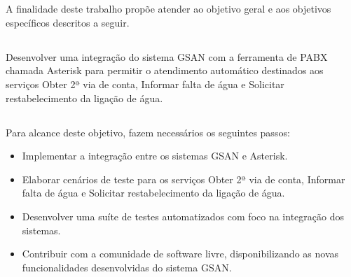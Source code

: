 \section*{\fontsize{12}{1} }

A finalidade deste trabalho propõe atender ao objetivo geral e aos objetivos específicos descritos a seguir.

\subsection*{\fontsize{12}{1} }

Desenvolver uma integração do sistema GSAN com a ferramenta de PABX chamada Asterisk para permitir o atendimento automático destinados aos serviços Obter 2ª via de conta, Informar falta de água e Solicitar restabelecimento da ligação de água.

\subsection*{\fontsize{12}{1} }
Para alcance deste objetivo, fazem necessários os seguintes passos:
\begin{itemize}
	\item Implementar a integração entre os sistemas GSAN e Asterisk.
	\item Elaborar cenários de teste para os serviços Obter 2ª via de conta, Informar falta de água e Solicitar restabelecimento da ligação de água.
	\item Desenvolver uma suíte de testes automatizados com foco na integração dos sistemas. 
	\item Contribuir com a comunidade de software livre, disponibilizando as novas funcionalidades desenvolvidas do sistema GSAN.
\end{itemize}